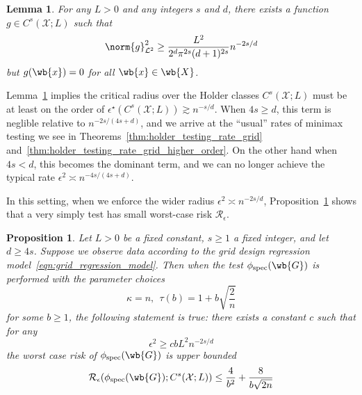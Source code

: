\documentclass{article}
\newcommand{\1}{\mathbf{1}}
\newcommand{\Xset}{\mathcal{X}}
\newcommand{\Leb}{\mathcal{L}}
\newcommand{\spec}{\mathrm{spec}}
\theoremstyle{alden}
\theoremstyle{aldenthm}
\newtheorem{lemma}{Lemma}
\newtheorem{proposition}{Proposition}
\theoremstyle{definition}
\theoremstyle{remark}
\begin{document}
\begin{lemma}
	\label{lem:holder_testing_rate_grid_low_smoothness_lb}
	For any $L > 0$ and any integers $s$ and $d$, there exists a function $g \in C^s(\Xset;L)$ such that
	\begin{equation*}
	\norm{g}_{\Leb^2}^2 \geq \frac{L^2}{2^d \pi^{2s} (d + 1)^{2s}}n^{-2s/d} 
	\end{equation*}
	but $g(\wb{x}) = 0$ for all $\wb{x} \in \wb{X}$. 
\end{lemma}
Lemma~\ref{lem:holder_testing_rate_grid_low_smoothness_lb} implies the critical radius over the Holder classes $C^s(\Xset;L)$ must be at least on the order of $\epsilon^{\star}(C^s(\Xset;L)) \gtrsim n^{-s/d}$. When $4s \geq d$, this term is neglible relative to $n^{-2s/(4s + d)}$, and we arrive at the ``usual'' rates of minimax testing we see in Theorems~\ref{thm:holder_testing_rate_grid} and~\ref{thm:holder_testing_rate_grid_higher_order}. On the other hand when $4s < d$, this becomes the dominant term, and we can no longer achieve the typical rate $\epsilon^2 \asymp n^{-4s/(4s + d)}$. 

In this setting, when we enforce the wider radius $\epsilon^2 \asymp n^{-2s/d}$, Proposition~\ref{prop:holder_testing_rate_grid_low_smoothness_ub} shows that a very simply test has small worst-case risk $\mathcal{R}_{\epsilon}$. 

\begin{proposition}
	\label{prop:holder_testing_rate_grid_low_smoothness_ub}
	Let $L > 0$ be a fixed constant, $s \geq 1$ a fixed integer, and let $d \geq 4s$. Suppose we observe data according to the grid design regression model~\eqref{eqn:grid_regression_model}. Then when the test $\phi_{\spec}(\wb{G})$ is performed with the parameter choices
	\begin{equation*}
	\kappa = n,~~ \tau(b) = 1 + b\sqrt{\frac{2}{n}}
	\end{equation*}
	for some $b \geq 1$, the following statement is true: there exists a constant $c$ such that for any 
	\begin{equation*}
	\epsilon^2 \geq c b L^2 n^{-2s/d}
	\end{equation*}
	the worst case risk of $\phi_{\spec}(\wb{G})$ is upper bounded
	\begin{equation*}
	\mathcal{R}_{\epsilon}(\phi_{\spec}(\wb{G}); C^s(\Xset;L)) \leq \frac{4}{b^2} + \frac{8}{b\sqrt{2n}}
	\end{equation*}
\end{proposition}
\end{document}
